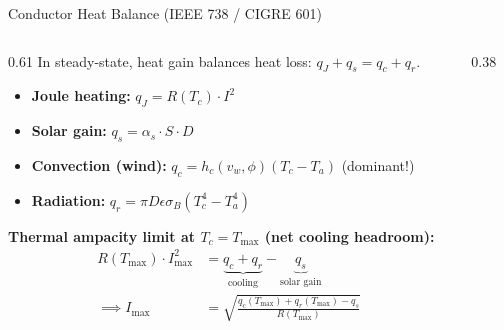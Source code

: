 \begin{frame}{Conductor Heat Balance (IEEE 738 / CIGRE 601)}
\begin{columns}[c]
    \begin{column}{0.61\textwidth}
    \footnotesize
    In steady-state, heat gain balances heat loss: $q_J + q_s = q_c + q_r$.
    \vspace{0.2em}
    \begin{itemize}\setlength{\itemsep}{2pt}\setlength{\parsep}{0pt}\setlength{\parskip}{0pt}
        \item \textbf{Joule heating:} $q_J = R(T_c) \cdot I^2$
        \item \textbf{Solar gain:} $q_s = \alpha_s \cdot S \cdot D$
        \item \textbf{Convection (wind):} $q_c = h_c(v_w, \phi)(T_c - T_a)$ (\alert{dominant!})
        \item \textbf{Radiation:} $q_r = \pi D \epsilon \sigma_B (T_c^4 - T_a^4)$
    \end{itemize}
    \vspace{0.3em}
    \textbf{Thermal ampacity limit at $T_c = T_{\text{max}}$ (net cooling headroom):}
    \vspace{-0.4em}
    {\footnotesize
    \[
    \begin{aligned}
        R(T_{\text{max}}) \cdot I_{\text{max}}^2 &= \underbrace{q_c + q_r}_{\text{cooling}} - \underbrace{q_s}_{\text{solar gain}} \\[2pt]
        \implies I_{\text{max}} &= \sqrt{\frac{q_c(T_{\text{max}}) + q_r(T_{\text{max}}) - q_s}{R(T_{\text{max}})}}
    \end{aligned}
    \]}
    \end{column}
    \begin{column}{0.38\textwidth}
        \centering
        
    \end{column}
\end{columns}
\end{frame}


